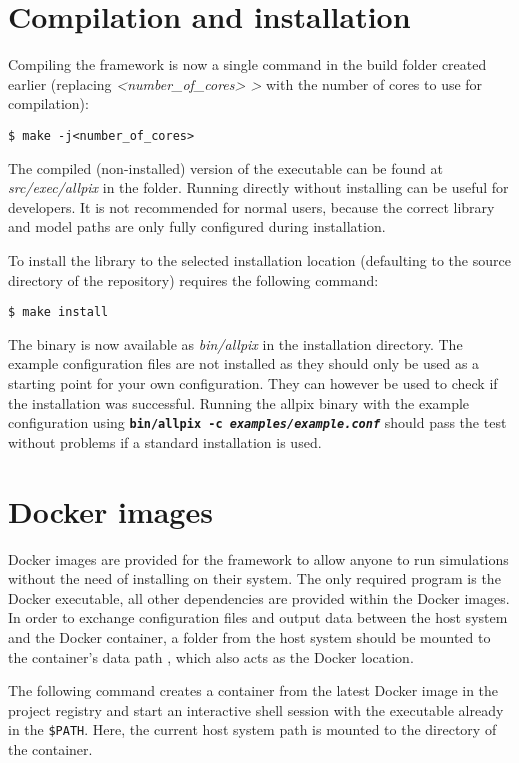 \section{Compilation and installation}
Compiling the framework is now a single command in the build folder created earlier (replacing \textit{\textless number\_of\_cores> \textgreater} with the number of cores to use for compilation):
\begin{verbatim}
$ make -j<number_of_cores>
\end{verbatim}
The compiled (non-installed) version of the executable can be found at \textit{src/exec/allpix} in the  folder.
Running \apsq directly without installing can be useful for developers.
It is not recommended for normal users, because the correct library and model paths are only fully configured during installation.

To install the library to the selected installation location (defaulting to the source directory of the repository) requires the following command:
\begin{verbatim}
$ make install
\end{verbatim}

The binary is now available as \textit{bin/allpix} in the installation directory.
The example configuration files are not installed as they should only be used as a starting point for your own configuration.
They can however be used to check if the installation was successful.
Running the allpix binary with the example configuration using \texttt{\textbf{bin/allpix -c \textit{examples/example.conf}}} should pass the test without problems if a standard installation is used.

\section{Docker images}
\label{sec:docker}
Docker images are provided for the framework to allow anyone to run simulations without the need of installing \apsq on their system.
The only required program is the Docker executable, all other dependencies are provided within the Docker images.
In order to exchange configuration files and output data between the host system and the Docker container, a folder from the host system should be mounted to the container's data path , which also acts as the Docker  location.

The following command creates a container from the latest Docker image in the project registry and start an interactive shell session with the  executable already in the \texttt{\$PATH}.
Here, the current host system path is mounted to the  directory of the container.

